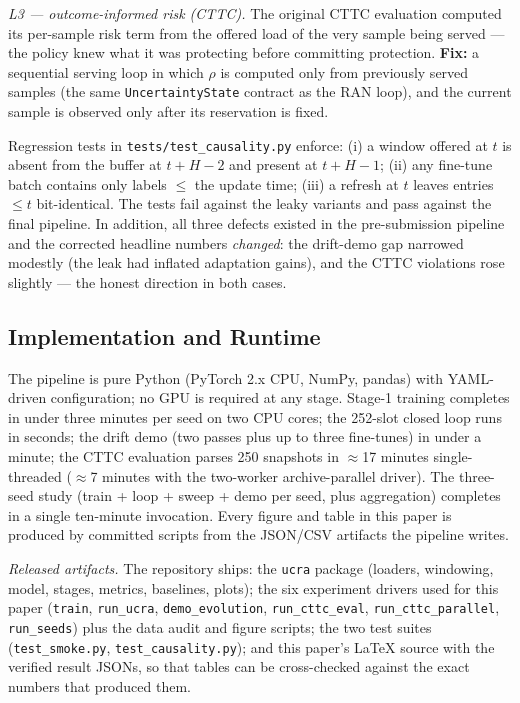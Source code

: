 \emph{L3 --- outcome-informed risk (CTTC).} The original CTTC
evaluation computed its per-sample risk term from the offered load of
the very sample being served --- the policy knew what it was
protecting before committing protection. \textbf{Fix:} a sequential
serving loop in which $\rho$ is computed only from previously served
samples (the same \texttt{UncertaintyState} contract as the RAN
loop), and the current sample is observed only after its reservation
is fixed.

Regression tests in \texttt{tests/test\_causality.py} enforce: (i) a
window offered at $t$ is absent from the buffer at $t{+}H{-}2$ and
present at $t{+}H{-}1$; (ii) any fine-tune batch contains only labels
$\le$ the update time; (iii) a refresh at $t$ leaves entries
$\le t$ bit-identical. The tests fail against the leaky variants and
pass against the final pipeline. In addition, all three defects
existed in the pre-submission pipeline and the corrected headline
numbers \emph{changed}: the drift-demo gap narrowed modestly (the
leak had inflated adaptation gains), and the CTTC violations rose
slightly --- the honest direction in both cases.

\subsection{Implementation and Runtime}

The pipeline is pure Python (PyTorch 2.x CPU, NumPy, pandas) with
YAML-driven configuration; no GPU is required at any stage. Stage-1
training completes in under three minutes per seed on two CPU cores;
the 252-slot closed loop runs in seconds; the drift demo (two passes
plus up to three fine-tunes) in under a minute; the CTTC evaluation
parses 250 snapshots in $\approx$17 minutes single-threaded
($\approx$7 minutes with the two-worker archive-parallel driver).
The three-seed study (train + loop + sweep + demo per seed, plus
aggregation) completes in a single ten-minute invocation. Every
figure and table in this paper is produced by committed scripts from
the JSON/CSV artifacts the pipeline writes.

\emph{Released artifacts.} The repository ships: the \texttt{ucra}
package (loaders, windowing, model, stages, metrics, baselines,
plots); the six experiment drivers used for this paper
(\texttt{train}, \texttt{run\_ucra}, \texttt{demo\_evolution},
\texttt{run\_cttc\_eval}, \texttt{run\_cttc\_parallel},
\texttt{run\_seeds}) plus the data audit and figure scripts; the two
test suites (\texttt{test\_smoke.py}, \texttt{test\_causality.py});
and this paper's \LaTeX{} source with the verified result JSONs, so
that tables can be cross-checked against the exact numbers that
produced them.
